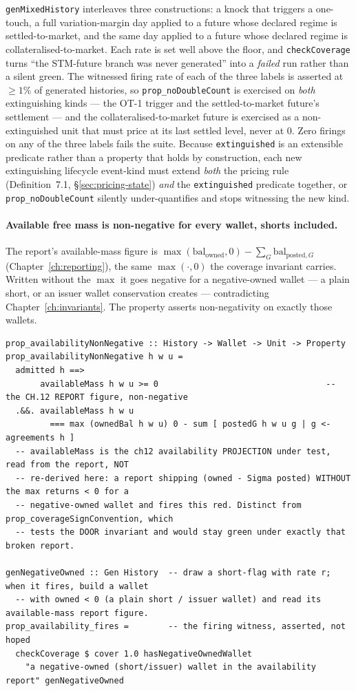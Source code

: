 \texttt{genMixedHistory} interleaves three constructions: a knock that triggers a one-touch, a
full variation-margin day applied to a future whose declared regime is settled-to-market, and
the same day applied to a future whose declared regime is collateralised-to-market. Each rate is
set well above the floor, and \texttt{checkCoverage} turns ``the STM-future branch was never
generated'' into a \emph{failed} run rather than a silent green. The witnessed firing rate of
each of the three labels is asserted at $\ge 1\%$ of generated histories, so
\texttt{prop\_noDoubleCount} is exercised on \emph{both} extinguishing kinds --- the OT-1 trigger
and the settled-to-market future's settlement --- and the collateralised-to-market future is
exercised as a non-extinguished unit that must price at its last settled level, never at $0$.
Zero firings on any of the three labels fails the suite. Because \texttt{extinguished} is an
extensible predicate rather than a property that holds by construction, each new extinguishing
lifecycle event-kind must extend \emph{both} the pricing rule (Definition~7.1,
\S\ref{sec:pricing-state}) \emph{and} the \texttt{extinguished} predicate together, or
\texttt{prop\_noDoubleCount} silently under-quantifies and stops witnessing the new kind.

\paragraph{Available free mass is non-negative for every wallet, shorts included.}
The report's available-mass figure is $\max(\mathrm{bal}_{\text{owned}},0)-\sum_G
\mathrm{bal}_{\text{posted},G}$ (Chapter~\ref{ch:reporting}), the same $\max(\cdot,0)$ the
coverage invariant carries. Written without the $\max$ it goes negative for a negative-owned
wallet --- a plain short, or an issuer wallet conservation creates --- contradicting
Chapter~\ref{ch:invariants}. The property asserts non-negativity on exactly those wallets.

\begin{lstlisting}
prop_availabilityNonNegative :: History -> Wallet -> Unit -> Property
prop_availabilityNonNegative h w u =
  admitted h ==>
       availableMass h w u >= 0                                  -- the CH.12 REPORT figure, non-negative
  .&&. availableMass h w u
         === max (ownedBal h w u) 0 - sum [ postedG h w u g | g <- agreements h ]
  -- availableMass is the ch12 availability PROJECTION under test, read from the report, NOT
  -- re-derived here: a report shipping (owned - Sigma posted) WITHOUT the max returns < 0 for a
  -- negative-owned wallet and fires this red. Distinct from prop_coverageSignConvention, which
  -- tests the DOOR invariant and would stay green under exactly that broken report.

genNegativeOwned :: Gen History  -- draw a short-flag with rate r; when it fires, build a wallet
  -- with owned < 0 (a plain short / issuer wallet) and read its available-mass report figure.
prop_availability_fires =        -- the firing witness, asserted, not hoped
  checkCoverage $ cover 1.0 hasNegativeOwnedWallet
    "a negative-owned (short/issuer) wallet in the availability report" genNegativeOwned
\end{lstlisting}

